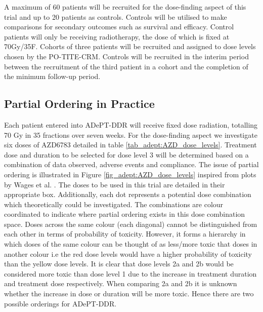 A maximum of 60 patients will be recruited for the dose-finding aspect of this trial and up to 20 patients as controls. Controls will be utilised to make comparisons for secondary outcomes such as survival and efficacy. Control patients will only be receiving radiotherapy, the dose of which is fixed at 70Gy/35F. Cohorts of three patients will be recruited and assigned to dose levels chosen by the PO-TITE-CRM. Controls will be recruited in the interim period between the recruitment of the third patient in a cohort and the completion of the minimum follow-up period.    

\subsection{Partial Ordering in Practice}
\label{adept:Partial-ordering-in-practice}%

Each patient entered into ADePT-DDR will receive fixed dose radiation, totalling 70 Gy in 35 fractions over seven weeks. For the dose-finding aspect we investigate six doses of AZD6783 detailed in table \ref{tab_adept:AZD_dose_levels}. Treatment dose and duration to be selected for dose level 3 will be determined based on a combination of data observed, adverse events and compliance. The issue of partial ordering is illustrated in Figure \ref{fig_adept:AZD_dose_levels} inspired from plots by Wages et al. \cite{wagesUsingTimetoeventContinual2013}. The doses to be used in this trial are detailed in their appropriate box. Additionally, each dot represents a potential dose combination which theoretically could be investigated. The combinations are colour coordinated to indicate where partial ordering exists in this dose combination space. Doses across the same colour (each diagonal) cannot be distinguished from each other in terms of probability of toxicity. However, it forms a hierarchy in which doses of the same colour can be thought of as less/more toxic that doses in another colour i.e the red dose levels would have a higher probability of toxicity than the yellow dose levels. It is clear that dose levels 2a and 2b would be considered more toxic than dose level 1 due to the increase in treatment duration and treatment dose respectively. When comparing 2a and 2b it is unknown whether the increase in dose or duration will be more toxic. Hence there are two possible orderings for ADePT-DDR. 

